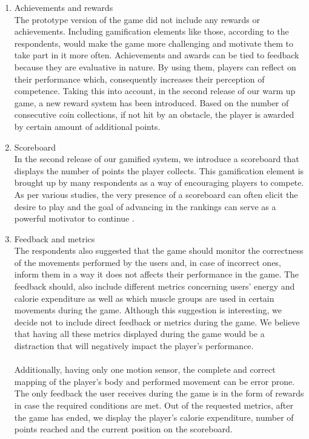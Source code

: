 \begin{enumerate}
\item Achievements and rewards\\
The prototype version of the game did not include any rewards or achievements. Including gamification elements like those, according to the respondents, would make the game more challenging and motivate them to take part in it more often. Achievements and awards can be tied to feedback because they are evaluative in nature. By using them, players can reflect on their performance which, consequently increases their perception of competence. Taking this into account, in the second release of our warm up game, a new reward system has been introduced. Based on the number of consecutive coin collections, if not hit by an obstacle, the player is awarded by certain amount of additional points. 
\item Scoreboard\\
In the second release of our gamified system, we introduce a scoreboard that displays the number of points the player collects. This gamification element is brought up by many respondents as a way of encouraging players to compete. As per various studies, the very presence of a scoreboard can often elicit the desire to play and the goal of advancing in the rankings can serve as a powerful motivator to continue \cite{schobel2016agony}. 
\item Feedback and metrics\\
The respondents also suggested that the game should monitor the correctness of the movements performed by the users and, in case of incorrect ones, inform them in a way it does not affects their performance in the game. The feedback should, also include different metrics concerning users' energy and calorie expenditure as well as which muscle groups are used in certain movements during the game. Although this suggestion is interesting, we decide not to include direct feedback or metrics during the game. We believe that having all these metrics displayed during the game would be a distraction that will negatively impact the player's performance. \\\\Additionally, having only one motion sensor, the complete and correct mapping of the player's body and performed movement can be error prone. The only feedback the user receives during the game is in the form of rewards in case the required conditions are met. Out of the requested metrics, after the game has ended, we display the player's calorie expenditure, number of points reached and the current position on the scoreboard.  
	\end{enumerate}
